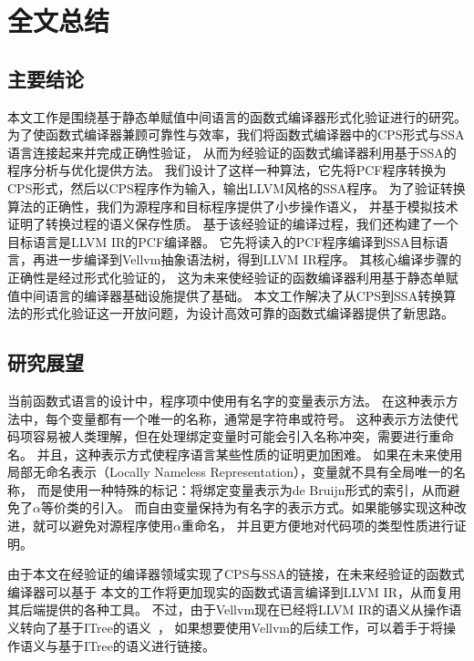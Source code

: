 
\chapter{全文总结} \label{ch:summary}

\section{主要结论}

本文工作是围绕基于静态单赋值中间语言的函数式编译器形式化验证进行的研究。
为了使函数式编译器兼顾可靠性与效率，我们将函数式编译器中的CPS形式与SSA语言连接起来并完成正确性验证，
从而为经验证的函数式编译器利用基于SSA的程序分析与优化提供方法。
我们设计了这样一种算法，它先将PCF程序转换为CPS形式，然后以CPS程序作为输入，输出LLVM风格的SSA程序。
为了验证转换算法的正确性，我们为源程序和目标程序提供了小步操作语义，
并基于模拟技术证明了转换过程的语义保存性质。
基于该经验证的编译过程，我们还构建了一个目标语言是LLVM IR的PCF编译器。
它先将读入的PCF程序编译到SSA目标语言，再进一步编译到Vellvm抽象语法树，得到LLVM IR程序。
其核心编译步骤的正确性是经过形式化验证的，
这为未来使经验证的函数编译器利用基于静态单赋值中间语言的编译器基础设施提供了基础。
本文工作解决了从CPS到SSA转换算法的形式化验证这一开放问题，为设计高效可靠的函数式编译器提供了新思路。

\section{研究展望}

当前函数式语言的设计中，程序项中使用有名字的变量表示方法。
在这种表示方法中，每个变量都有一个唯一的名称，通常是字符串或符号。
这种表示方法使代码项容易被人类理解，但在处理绑定变量时可能会引入名称冲突，需要进行重命名。
并且，这种表示方式使程序语言某些性质的证明更加困难。
如果在未来使用局部无命名表示（Locally Nameless Representation），变量就不具有全局唯一的名称，
而是使用一种特殊的标记：将绑定变量表示为de Bruijn形式的索引，从而避免了$\alpha$等价类的引入。
而自由变量保持为有名字的表示方式。如果能够实现这种改进，就可以避免对源程序使用$\alpha$重命名，
并且更方便地对代码项的类型性质进行证明。

由于本文在经验证的编译器领域实现了CPS与SSA的链接，在未来经验证的函数式编译器可以基于
本文的工作将更加现实的函数式语言编译到LLVM IR，从而复用其后端提供的各种工具。
不过，由于Vellvm现在已经将LLVM IR的语义从操作语义转向了基于ITree的语义~\cite{itree2019,itreevellvm2021}，
如果想要使用Vellvm的后续工作，可以着手于将操作语义与基于ITree的语义进行链接。
